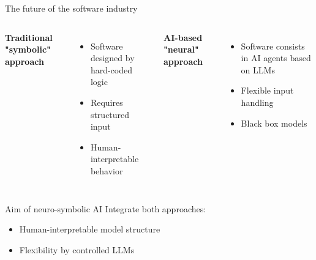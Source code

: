 \documentclass{beamer}
\begin{document}
    \begin{frame}{The future of the software industry}
        \begin{columns}
            \textbf{Traditional "symbolic" approach}
            \begin{itemize}
                \item Software designed by hard-coded logic
                \item \textcolor{red!90!black}{Requires structured input}
                \item \textcolor{green!80!black}{Human-interpretable behavior}
            \end{itemize}

            \textbf{AI-based "neural" approach}
            \begin{itemize}
                \item Software consists in AI agents based on LLMs
                \item \textcolor{green!80!black}{Flexible input handling}
                \item \textcolor{red!90!black}{Black box models}
            \end{itemize}

        \end{columns}

        \medskip

        \begin{block}{Aim of neuro-symbolic AI}
            Integrate both approaches:
            \begin{itemize}
                \item Human-interpretable model structure
                \item Flexibility by controlled LLMs
            \end{itemize}
        \end{block}
    \end{frame}
\end{document}
